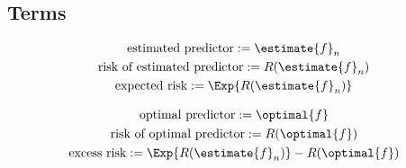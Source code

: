 \documentclass[18pt,a3paper,landscape, ncols=3]{cheatsheet}
\begin{document}
	\subsection{Terms}
		\begin{mdframed}
			\begin{minipage}{0.5\linewidth}
				\begin{gather*}
					\text{estimated predictor} := \estimate{f}_{n} \\
					\text{risk of estimated predictor} := R(\estimate{f}_{n}) \\
					\text{expected risk} := \Exp{R(\estimate{f}_{n})}
				\end{gather*}
			\end{minipage}%
			\begin{minipage}{0.5\linewidth}
				\begin{gather*}
					\text{optimal predictor} := \optimal{f} \\
					\text{risk of optimal predictor} := R(\optimal{f}) \\
					\text{excess risk} := \Exp{R(\estimate{f}_{n})} - R(\optimal{f})
				\end{gather*}
			\end{minipage}
		\end{mdframed}
\end{document}
